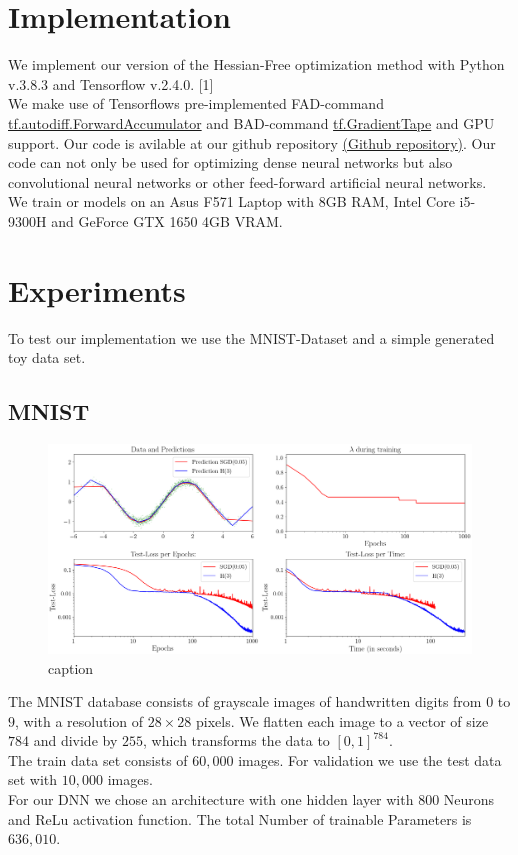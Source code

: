 \documentclass[conference]{IEEEtran}
\begin{document}
	
	
	\section {Implementation}
	\noindent
	We implement our version of the Hessian-Free optimization method with Python v.3.8.3 and Tensorflow v.2.4.0. [1] \\We make use of Tensorflows pre-implemented FAD-command \href{https://www.tensorflow.org/api_docs/python/tf/autodiff/ForwardAccumulator}{tf.autodiff.ForwardAccumulator} and BAD-command \href{https://www.tensorflow.org/api_docs/python/tf/GradientTape}{tf.GradientTape} and GPU support. Our code is avilable at our github repository \href{https://github.com/NiklasBrunn/Hessian_Free_Optimization_of_Deep_Neural_Networks}{(Github repository)}. Our code can not only be used for optimizing dense neural networks but also convolutional neural networks or other feed-forward artificial neural networks.
	\\We train or models on an Asus F571 Laptop with 8GB RAM, Intel Core i5-9300H and GeForce GTX 1650 4GB VRAM.	
	
	
	\section{Experiments}
	\noindent
	To test our implementation we use the MNIST-Dataset and a simple generated toy data set.
	\subsection{MNIST}
	\begin{figure}[tb]
		\centering
		\includegraphics[width=\textwidth]{toy_0.05.png}
		\caption{caption}
	\end{figure}
	
	\noindent
	The MNIST database consists of grayscale images of handwritten digits from $0$ to $9$, with a resolution of $28\times28$ pixels. We flatten each image to a vector of size $784$ and divide by $255$, which transforms the data to $[0,1]^{784}$.\\ The train data set consists of $60,000$ images. For validation we use the test data set with $10,000$ images.\\ 
	For our DNN we chose an architecture with one hidden layer with $800$ Neurons and ReLu activation function. The total Number of trainable Parameters is $636,010$.\\
\end{document}
